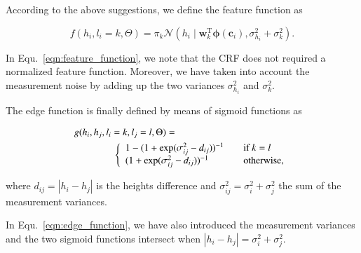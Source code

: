 According to the above suggestions, we define the feature function as

\begin{equation}
\label{eqn:feature_function}
f(h_i,l_i=k,\Theta)=\pi_k\mathcal{N}(h_i\mid\mathbf{w}_k^\text{T}
\boldsymbol{\phi}(\mathbf{c}_i), \sigma^2_{h_i} + \sigma^2_k).
\end{equation}

In Equ.~\eqref{eqn:feature_function}, we note that the CRF does not required a
normalized feature function. Moreover, we have taken into account the
measurement noise by adding up the two variances $\sigma^2_{h_i}$ and
$\sigma^2_{k}$.

The edge function is finally defined by means of sigmoid functions as

\begin{eqnarray}
\label{eqn:edge_function}
g(h_i,h_j,l_i=k,l_j=l,\Theta)=\phantom{aaaaaaaaaaaaaaaaaaaaaaa}\\ \nonumber
\left\{
\begin{array}{l l}
1-(1+\exp(\sigma^2_{ij}-d_{ij}))^{-1} & \quad
\text{if $k=l$}\\
(1+\exp(\sigma^2_{ij}-d_{ij}))^{-1} & \quad
\text{otherwise},
\end{array} \right.
\end{eqnarray}

where $d_{ij}=|h_i-h_j|$ is the heights difference and $\sigma^2_{ij}=\sigma^2_i
+\sigma^2_j$ the sum of the measurement variances.

In Equ.~\eqref{eqn:edge_function}, we have also introduced the measurement
variances and the two sigmoid functions intersect when $|h_i-h_j|=
\sigma^2_i+\sigma^2_j$.

